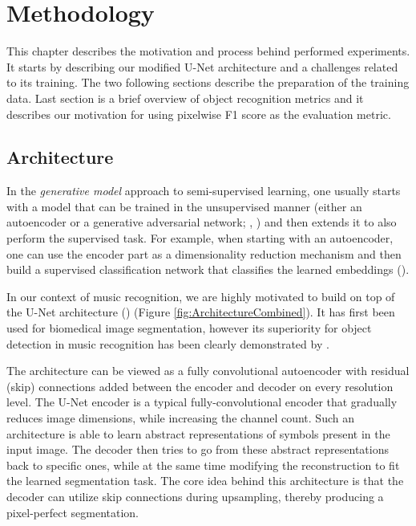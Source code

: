 \chapter{Methodology}
\label{chap:Methodology}

This chapter describes the motivation and process behind performed experiments. It starts by describing our modified U-Net architecture and a challenges related to its training. The two following sections describe the preparation of the training data. Last section is a brief overview of object recognition metrics and it describes our motivation for using pixelwise F1 score as the evaluation metric.


\section{Architecture}
\label{sec:Architecture}

In the \emph{generative model} approach to semi-supervised learning, one usually starts with a model that can be trained in the unsupervised manner (either an autoencoder or a generative adversarial network; \cite{AutoencodersOverview}, \cite{GAN}) and then extends it to also perform the supervised task. For example, when starting with an autoencoder, one can use the encoder part as a dimensionality reduction mechanism and then build a supervised classification network that classifies the learned embeddings (\cite{KingmaSslVae}).

In our context of music recognition, we are highly motivated to build on top of the U-Net architecture (\cite{UNet}) (Figure \ref{fig:ArchitectureCombined}). It has first been used for biomedical image segmentation, however its superiority for object detection in music recognition has been clearly demonstrated by \cite{PachaBaseline}.

The architecture can be viewed as a fully convolutional autoencoder with residual (skip) connections added between the encoder and decoder on every resolution level. The U-Net encoder is a typical fully-convolutional encoder that gradually reduces image dimensions, while increasing the channel count. Such an architecture is able to learn abstract representations of symbols present in the input image. The decoder then tries to go from these abstract representations back to specific ones, while at the same time modifying the reconstruction to fit the learned segmentation task. The core idea behind this architecture is that the decoder can utilize skip connections during upsampling, thereby producing a pixel-perfect segmentation.

